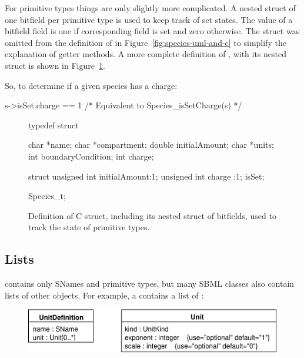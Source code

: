 \documentclass{cekmanual}
\begin{document}
For primitive types things are only slightly more complicated.  A
nested  struct of one bitfield per primitive type is
used to keep track of set states.  The value of a bitfield field is
one if corresponding field is set and zero otherwise.  The
 struct was omitted from the definition of
 in Figure~\ref{fig:species-uml-and-c} to simplify
the explanation of getter methods.  A more complete definition of
, with its  nested struct is shown
in Figure~\ref{fig:species-isSet}.


So, to determine if a given species  has a charge:

\begin{example}[c]
  s->isSet.charge == 1  /* Equivalent to Species_isSetCharge(s) */
\end{example}


\begin{figure}[bth]
  \begin{codeVerbatim}[C,flexiblecolumns=false]
typedef struct
{
  char    *name;
  char    *compartment;
  double  initialAmount;
  char    *units;
  int     boundaryCondition;
  int     charge;

  struct
  {
    unsigned int initialAmount:1;
    unsigned int charge       :1;
  } isSet;

} Species_t;
  \end{codeVerbatim}
  \caption{Definition of  C struct, including its
  nested  struct of bitfields, used to track the state
  of primitive types.}
  \label{fig:species-isSet}
\end{figure}


\subsection{Lists}
\label{sec:lists}

 contains only SNames and primitive types, but many
SBML classes also contain lists of other objects.  For example, a
 contains a list of :


\begin{figure}[h]
  \centering
  \includegraphics[scale=0.68]{unitdefinition}
  \label{fig:unit-definition}
\end{figure}
\end{document}
